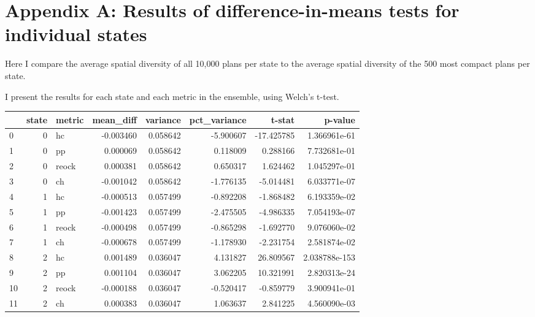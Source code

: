 \documentclass[]{article}
\begin{document}
\hypertarget{appendix-a-results-of-difference-in-means-tests-for-individual-states}{%
\section{Appendix A: Results of difference-in-means tests for individual
states}\label{appendix-a-results-of-difference-in-means-tests-for-individual-states}}

Here I compare the average spatial diversity of all 10,000 plans per
state to the average spatial diversity of the 500 most compact plans per
state.

I present the results for each state and each metric in the ensemble,
using Welch's t-test.

\begin{tabular}{lrlrrrrr}
\toprule
{} &  state & metric &  mean\_diff &  variance &  pct\_variance &      t-stat &        p-value \\
\midrule
0  &      0 &     hc &  -0.003460 &  0.058642 &     -5.900607 &  -17.425785 &   1.366961e-61 \\
1  &      0 &     pp &   0.000069 &  0.058642 &      0.118009 &    0.288166 &   7.732681e-01 \\
2  &      0 &  reock &   0.000381 &  0.058642 &      0.650317 &    1.624462 &   1.045297e-01 \\
3  &      0 &     ch &  -0.001042 &  0.058642 &     -1.776135 &   -5.014481 &   6.033771e-07 \\
4  &      1 &     hc &  -0.000513 &  0.057499 &     -0.892208 &   -1.868482 &   6.193359e-02 \\
5  &      1 &     pp &  -0.001423 &  0.057499 &     -2.475505 &   -4.986335 &   7.054193e-07 \\
6  &      1 &  reock &  -0.000498 &  0.057499 &     -0.865298 &   -1.692770 &   9.076060e-02 \\
7  &      1 &     ch &  -0.000678 &  0.057499 &     -1.178930 &   -2.231754 &   2.581874e-02 \\
8  &      2 &     hc &   0.001489 &  0.036047 &      4.131827 &   26.809567 &  2.038788e-153 \\
9  &      2 &     pp &   0.001104 &  0.036047 &      3.062205 &   10.321991 &   2.820313e-24 \\
10 &      2 &  reock &  -0.000188 &  0.036047 &     -0.520417 &   -0.859779 &   3.900941e-01 \\
11 &      2 &     ch &   0.000383 &  0.036047 &      1.063637 &    2.841225 &   4.560090e-03 \\

\end{tabular}
\end{document}
